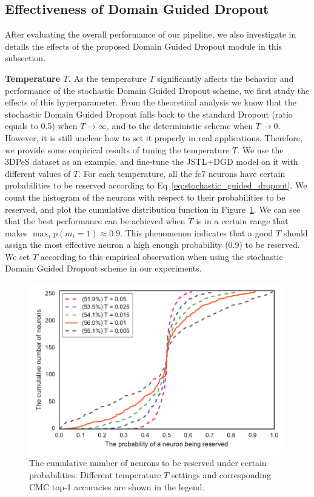 \subsection{Effectiveness of Domain Guided Dropout} %
\label{sub:effectiveness_of_the_guided_dropout_module}

After evaluating the overall performance of our pipeline, we also investigate in details the effects of the proposed Domain Guided Dropout module in this subsection.

\textbf{Temperature $T$.} As the temperature $T$ significantly affects the behavior and performance of the stochastic Domain Guided Dropout scheme, we first study the effects of this hyperparameter. From the theoretical analysis we know that the stochastic Domain Guided Dropout falls back to the standard Dropout (ratio equals to 0.5) when $T\to \infty$, and to the deterministic scheme when $T\to 0$. However, it is still unclear how to set it properly in real applications. Therefore, we provide some empirical results of tuning the temperature $T$. We use the 3DPeS dataset as an example, and fine-tune the JSTL+DGD model on it with different values of $T$. For each temperature, all the fc7 neurons have certain probabilities to be reserved according to Eq~\eqref{eq:stochastic_guided_dropout}. We count the histogram of the neurons with respect to their probabilities to be reserved, and plot the cumulative distribution function in Figure~\ref{fig:temp_cdf}. We can see that the best performance can be achieved when $T$ is in a certain range that makes $\max_i p(m_i=1) \approx 0.9$. This phenomenon indicates that a good $T$ should assign the most effective neuron a high enough probability (0.9) to be reserved. We set $T$ according to this empirical observation when using the stochastic Domain Guided Dropout scheme  in our experiments.

\begin{figure}[t]
\begin{center}
\includegraphics[width=0.9\linewidth]{figures/multi_domain/cdf_temperature.pdf}
\end{center}
\caption{The cumulative number of neurons to be reserved under certain probabilities. Different temperature $T$ settings and corresponding CMC top-1 accuracies are shown in the legend.}
\label{fig:temp_cdf}
\end{figure}

